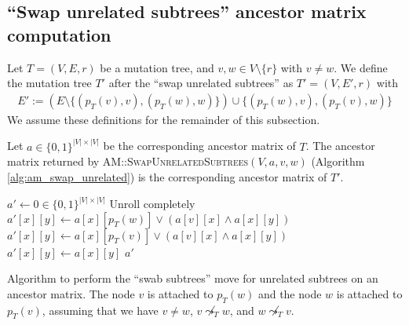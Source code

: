 \subsection{``Swap unrelated subtrees'' ancestor matrix computation}

\begin{definition}
    \label{def:swap_unrelated_subtrees}
    Let $T = (V, E, r)$ be a mutation tree, and $v, w \in V \setminus \{r\}$ with $v \neq w$. We define the mutation tree $T'$ after the ``swap unrelated subtrees'' as $T' = (V, E', r)$ with
    \begin{align*}
        E' := (E \setminus \{(p_T(v), v), (p_T(w), w)\}) \cup \{(p_T(w), v), (p_T(v), w)\}
    \end{align*}
    We assume these definitions for the remainder of this subsection.
\end{definition}

\begin{theorem}
    \label{theo:swap_unrelated_correctness}
    Let $a \in \{0,1\}^{|V| \times |V|}$ be the corresponding ancestor matrix of $T$. The ancestor matrix returned by \textsc{AM::Swap\-Unrelated\-Subtrees}$(V, a, v, w)$ (Algorithm \ref{alg:am_swap_unrelated}) is the corresponding ancestor matrix of $T'$.
\end{theorem}

\begin{algorithm}
    \begin{algorithmic}[1]
        \State $a' \leftarrow 0 \in \{0,1\}^{|V| \times |V|}$
             \Comment Unroll completely
                    \State $a'[x][y] \leftarrow a[x][p_T(w)] \vee (a[v][x] \wedge a[x][y])$
                    \State $a'[x][y] \leftarrow a[x][p_T(v)] \vee (a[v][x] \wedge a[x][y])$
                \Else
                    \State $a'[x][y] \leftarrow a[x][y]$
                \EndIf
            \EndFor
        \EndFor
        \State \Return $a'$
        \EndFunction
    \end{algorithmic}
    \caption{Algorithm to perform the ``swab subtrees'' move for unrelated subtrees on an ancestor matrix. The node $v$ is attached to $p_T(w)$ and the node $w$ is attached to $p_T(v)$, assuming that we have $v \neq w$, $v \not\leadsto_T w$, and $w \not\leadsto_T v$.}
    \label{alg:am_swap_unrelated}
\end{algorithm}

